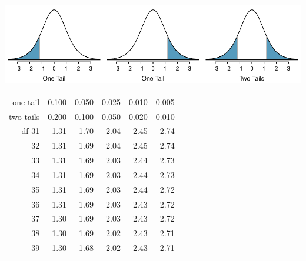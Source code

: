 \newpage

\begin{center}
\includegraphics[width=\textwidth]
    {extraTeX/tables/figures/tTails/tTails}
\end{center}

\begin{center}
\begin{tabular}{r | rrr rr}
\hline
one tail & \hspace{1.5mm}  0.100 & \hspace{1.5mm} 0.050 & \hspace{1.5mm} 0.025 & \hspace{1.5mm} 0.010 & \hspace{1.5mm} 0.005  \\
two tails & 0.200 & 0.100 & 0.050 & 0.020 & 0.010 \\
\hline
{df} \hfill 31  &  {\normalsize  1.31} & {\normalsize  1.70} & {\normalsize  2.04} & {\normalsize  2.45} & {\normalsize  2.74}  \\ 
32  &  {\normalsize  1.31} & {\normalsize  1.69} & {\normalsize  2.04} & {\normalsize  2.45} & {\normalsize  2.74}  \\ 
33  &  {\normalsize  1.31} & {\normalsize  1.69} & {\normalsize  2.03} & {\normalsize  2.44} & {\normalsize  2.73}  \\ 
34  &  {\normalsize  1.31} & {\normalsize  1.69} & {\normalsize  2.03} & {\normalsize  2.44} & {\normalsize  2.73}  \\ 
35  &  {\normalsize  1.31} & {\normalsize  1.69} & {\normalsize  2.03} & {\normalsize  2.44} & {\normalsize  2.72}  \\ 
\hline
36  &  {\normalsize  1.31} & {\normalsize  1.69} & {\normalsize  2.03} & {\normalsize  2.43} & {\normalsize  2.72}  \\ 
37  &  {\normalsize  1.30} & {\normalsize  1.69} & {\normalsize  2.03} & {\normalsize  2.43} & {\normalsize  2.72}  \\ 
38  &  {\normalsize  1.30} & {\normalsize  1.69} & {\normalsize  2.02} & {\normalsize  2.43} & {\normalsize  2.71}  \\ 
39  &  {\normalsize  1.30} & {\normalsize  1.68} & {\normalsize  2.02} & {\normalsize  2.43} & {\normalsize  2.71}  \\ 

\end{tabular}
\end{center}

